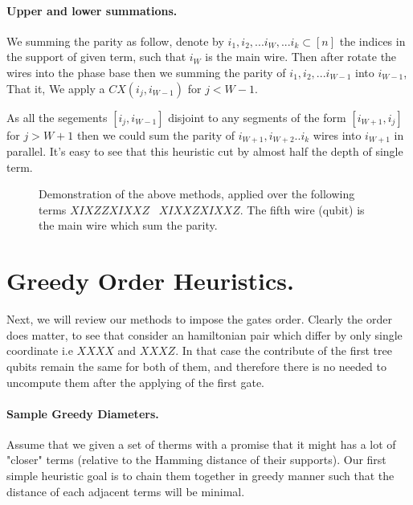 \documentclass{article}
\begin{document}
\begin{multicols*}{2}
\paragraph{Upper and lower summations.}  We summing the parity as follow, denote by \( i_{1}, i_{2}, ... i_{W} , ... i_{k} \subset [n] \) the indices in the support of given term, such that \(i_{W}\) is the main wire. Then after rotate the wires into the phase base then we summing the parity of \(i_{1}, i_{2}, ... i_{W-1}\) into \(i_{W-1}\), That it, We apply a \(CX\left(i_{j}, i_{W-1}\right)\) for \(j < W-1\). 

As all the segements \([i_{j}, i_{W-1}]\) disjoint to any segments of the form  \([i_{W+1}, i_{j}]\) for \(j > W+1\) then we could sum the parity of \(i_{W+1},   i_{W+2} .. i_{k}\) wires into \(i_{W+1}\) in parallel. It's easy to see that this heuristic cut by almost half the depth of single term. 

\begin{figure}[H]
  \centering
    
    \caption{ Demonstration of the above methods, applied over the following terms    \( XIXZZXIXXZ \) \ \( XIXXZXIXXZ \). The fifth wire (qubit) is the main wire which sum the parity. }
    \label{fig:average-data-vs-model}
\end{figure}


\section{Greedy Order Heuristics.}
Next, we will review our methods to impose the gates order. Clearly the order does matter, to see that consider an hamiltonian pair which differ by only single coordinate i.e \(XXXX\) and \(XXXZ\). In that case the contribute of the first tree qubits remain the same for both of them, and therefore there is no needed to uncompute them after the applying of the first gate.      
\paragraph{Sample Greedy Diameters.} Assume that we given a set of therms with a promise that it might has a lot of "closer" terms (relative to the Hamming distance of their supports). Our first simple heuristic goal is to chain them together in greedy manner such that the distance of each adjacent terms will be minimal. 



\end{multicols*}
\end{document}
